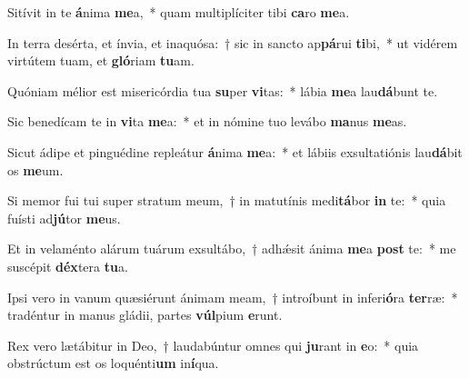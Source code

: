 \item Sitívit in te \textbf{á}nima \textbf{me}a,~* quam multiplíciter tibi \textbf{ca}ro \textbf{me}a.
\item In terra desérta, et ínvia, et inaquósa:~† sic in sancto ap\textbf{pá}rui \textbf{ti}bi,~* ut vidérem virtútem tuam, et \textbf{gló}riam \textbf{tu}am.
\item Quóniam mélior est misericórdia tua \textbf{su}per \textbf{vi}tas:~* lábia \textbf{me}a lau\textbf{dá}bunt te.
\item Sic benedícam te in \textbf{vi}ta \textbf{me}a:~* et in nómine tuo levábo \textbf{ma}nus \textbf{me}as.
\item Sicut ádipe et pinguédine repleátur \textbf{á}nima \textbf{me}a:~* et lábiis exsultatiónis lau\textbf{dá}bit os \textbf{me}um.
\item Si memor fui tui super stratum meum,~† in matutínis medi\textbf{tá}bor \textbf{in} te:~* quia fuísti ad\textbf{jú}tor \textbf{me}us.
\item Et in velaménto alárum tuárum exsultábo,~† adhǽsit ánima \textbf{me}a \textbf{post} te:~* me suscépit \textbf{déx}tera \textbf{tu}a.
\item Ipsi vero in vanum quæsiérunt ánimam meam,~† introíbunt in inferi\textbf{ó}ra \textbf{ter}ræ:~* tradéntur in manus gládii, partes \textbf{vúl}pium \textbf{e}runt.
\item Rex vero lætábitur in Deo,~† laudabúntur omnes qui \textbf{ju}rant in \textbf{e}o:~* quia obstrúctum est os loquénti\textbf{um} in\textbf{í}qua.
